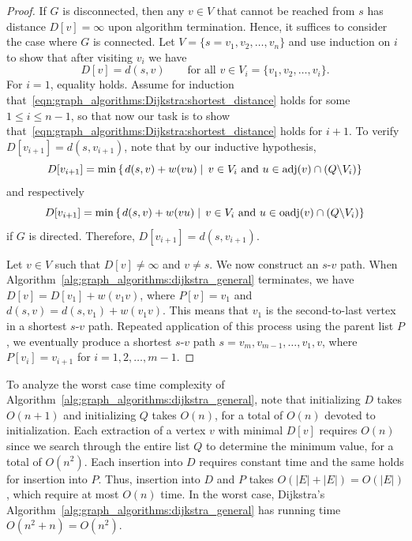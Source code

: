 \begin{proof}
If $G$ is disconnected, then any $v \in V$ that cannot be reached from
$s$ has distance $D[v] = \infty$ upon algorithm termination. Hence, it
suffices to consider the case where $G$ is connected. Let
$V = \{s=v_1, v_2, \dots, v_n\}$ and use induction on $i$ to show that
after visiting $v_i$ we have
%
\begin{equation}
\label{eqn:graph_algorithms:Dijkstra:shortest_distance}
D[v]
=
d(s,v)
\qquad
\text{for all $v \in V_i = \{v_1, v_2, \dots, v_i\}$}.
\end{equation}
%
For $i = 1$, equality holds. Assume for induction
that~\eqref{eqn:graph_algorithms:Dijkstra:shortest_distance} holds for
some $1 \leq i \leq n - 1$, so that now our task is to show
that~\eqref{eqn:graph_algorithms:Dijkstra:shortest_distance} holds for
$i + 1$. To verify $D[v_{i+1}] = d(s, v_{i+1})$, note that by our
inductive hypothesis,
\[
D[v_{i+1}]
=
\min \left\{
\left. d(s,v) + w(vu) \;\right|\;
v \in V_i \text{ and } u \in \operatorname*{adj}(v) \cap (Q \backslash V_i)
\right\}
\]
and respectively
\[
D[v_{i+1}]
=
\min \left\{
\left. d(s,v) + w(vu) \;\right|\;
v \in V_i \text{ and } u \in \operatorname*{oadj}(v) \cap (Q \backslash V_i)
\right\}
\]
if $G$ is directed. Therefore, $D[v_{i+1}] = d(s, v_{i+1})$.

Let $v \in V$ such that $D[v] \neq \infty$ and $v \neq s$. We now
construct an $s$-$v$ path. When
Algorithm~\ref{alg:graph_algorithms:dijkstra_general} terminates, we
have $D[v] = D[v_1] + w(v_1 v)$, where $P[v] = v_1$ and
$d(s,v) = d(s, v_1) + w(v_1 v)$. This means that $v_1$ is the
second-to-last vertex in a shortest $s$-$v$ path. Repeated application
of this process using the parent list $P$, we eventually produce a
shortest $s$-$v$ path $s=v_m, v_{m-1}, \dots, v_1, v$, where
$P[v_i] = v_{i+1}$ for $i = 1, 2, \dots, m - 1$.
\end{proof}

To analyze the worst case time complexity of
Algorithm~\ref{alg:graph_algorithms:dijkstra_general}, note that
initializing $D$ takes $O(n + 1)$ and initializing $Q$ takes $O(n)$,
for a total of $O(n)$ devoted to initialization. Each extraction of a
vertex $v$ with minimal $D[v]$ requires $O(n)$ since we search through
the entire list $Q$ to determine the minimum value, for a total of
$O(n^2)$. Each insertion into $D$ requires constant time and the same
holds for insertion into $P$. Thus, insertion into $D$ and $P$ takes
$O(|E| + |E|) = O(|E|)$, which require at most $O(n)$ time. In the
worst case, Dijkstra's
Algorithm~\ref{alg:graph_algorithms:dijkstra_general} has running time
$O(n^2 + n) = O(n^2)$.

